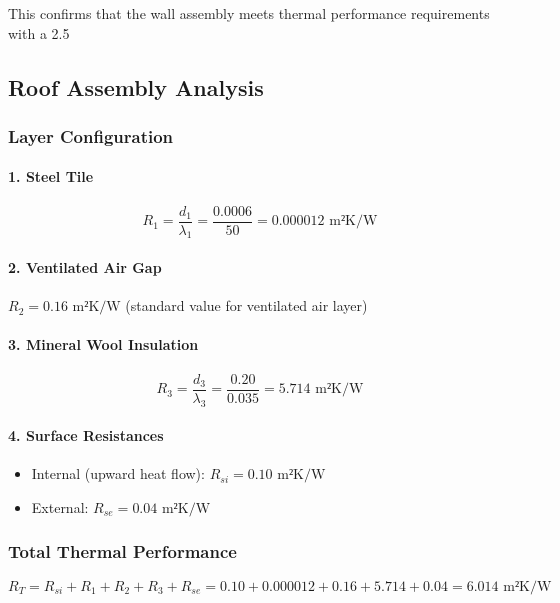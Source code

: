 \documentclass[12pt,a4paper]{article}
\begin{document}
This confirms that the wall assembly meets thermal performance requirements with a 2.5%

\subsection{Roof Assembly Analysis}
\subsubsection{Layer Configuration}
\paragraph{1. Steel Tile}
\begin{equation}
R_1 = \frac{d_1}{\lambda_1} = \frac{0.0006}{50} = 0.000012 \text{ m²K/W}
\end{equation}

\paragraph{2. Ventilated Air Gap}
$R_2 = 0.16 \text{ m²K/W}$ (standard value for ventilated air layer)

\paragraph{3. Mineral Wool Insulation}
\begin{equation}
R_3 = \frac{d_3}{\lambda_3} = \frac{0.20}{0.035} = 5.714 \text{ m²K/W}
\end{equation}

\paragraph{4. Surface Resistances}
\begin{itemize}
    \item Internal (upward heat flow): $R_{si} = 0.10 \text{ m²K/W}$
    \item External: $R_{se} = 0.04 \text{ m²K/W}$
\end{itemize}

\subsubsection{Total Thermal Performance}
\begin{equation}
R_T = R_{si} + R_1 + R_2 + R_3 + R_{se} = 0.10 + 0.000012 + 0.16 + 5.714 + 0.04 = 6.014 \text{ m²K/W}
\end{equation}
\end{document}
